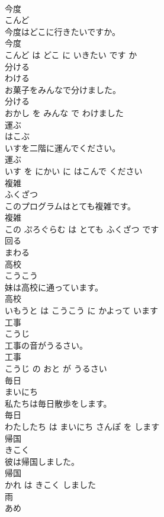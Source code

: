\documentclass[8pt]{extreport}
\begin{document}
\begin{CJK}{UTF8}{min}
\\	今度	
\\	こんど			
\\	今度はどこに行きたいですか。	
\\	今度 
\\	こんど は どこ に いきたい です か			
\\	分ける	
\\	わける			
\\	お菓子をみんなで分けました。	
\\	分ける 
\\	おかし を みんな で わけました			
\\	運ぶ	
\\	はこぶ			
\\	いすを二階に運んでください。	
\\	運ぶ 
\\	いす を にかい に はこんで ください			
\\	複雑	
\\	ふくざつ			
\\	このプログラムはとても複雑です。	
\\	複雑 
\\	この ぷろぐらむ は とても ふくざつ です			
\\	回る	
\\	まわる			
\\	高校	
\\	こうこう			
\\	妹は高校に通っています。	
\\	高校 
\\	いもうと は こうこう に かよって います			
\\	工事	
\\	こうじ			
\\	工事の音がうるさい。	
\\	工事 
\\	こうじ の おと が うるさい			
\\	毎日	
\\	まいにち			
\\	私たちは毎日散歩をします。	
\\	毎日 
\\	わたしたち は まいにち さんぽ を します			
\\	帰国	
\\	きこく			
\\	彼は帰国しました。	
\\	帰国 
\\	かれ は きこく しました			
\\	雨	
\\	あめ			

\end{CJK}
\end{document}
